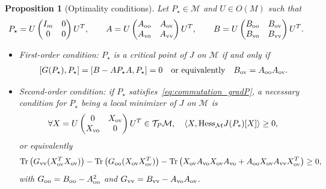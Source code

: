 \documentclass{article}
\newtheorem{proposition}[theorem]{Proposition}
\newcommand{\tr}{{\rm Tr}}
\newcommand{\1}{{\mathds 1}}
\begin{document}
\begin{proposition}[Optimality conditions] \label{Prop:commutation1storder} Let 
$P_\star \in \mathcal M$ and $U \in O(M)$ such that
\begin{align}
    P_\star = U\begin{pmatrix} I_m & 0 \\ 0 & 0\end{pmatrix}U^T, \qquad  
    A = U \begin{pmatrix} A_{\rm oo} & A_{\rm ov} \\ A_{\rm vo} & A_{\rm vv}\end{pmatrix}U^T, \qquad B = U\begin{pmatrix} B_{\rm oo} & B_{\rm ov} \\ B_{\rm vo} & B_{\rm vv}\end{pmatrix}U^T. \label{eq:Pstar_A_B}
\end{align}
\begin{itemize}
\item First-order condition: $P_\star$ is a critical point of $J$ on $\mathcal M$ if and only if 
\begin{align}
\label{eq:commutation_gradP}
    [G(P_\star),P_\star] = [B-AP_\star A,P_\star] =0 \quad \mbox{or equivalently} \quad B_{\rm ov}=A_{\rm oo}A_{\rm ov}.
\end{align}
\item Second-order condition: if $P_\star$ satisfies~\eqref{eq:commutation_gradP}, a necessary condition for $P_\star$ being a local minimizer of $J$ on $\mathcal M$ is 
\begin{align} \label{eq:2nd_order_cond}
  \forall X =   U\begin{pmatrix} 0 & X_{\rm ov} \\ X_{\rm vo} & 0\end{pmatrix}U^T \in \mathcal{T}_{P}\mathcal{M}, \quad \langle X, \mbox{\rm Hess}_{\mathcal{M}} J(P_*)[X] \rangle \ge 0,
\end{align}
or equivalently 
$$
 \tr\left( G_{\rm vv}(X_{\rm ov}^TX_{\rm ov})\right)- \tr \left(G_{\rm oo}(X_{\rm ov}X_{\rm ov}^T)\right) - \tr \left( X_{\rm ov}  A_{\rm vo }X_{\rm ov} A_{\rm vo}+ A_{\rm oo}X_{\rm ov}A_{\rm vv} X_{\rm ov}^T \right) \ge 0,
$$
with $G_{\rm oo}=B_{\rm oo}-A_{\rm oo}^2$ and $G_{\rm vv}=B_{\rm vv}-A_{\rm vo}A_{\rm ov}$. 
\end{itemize}
\end{proposition}
\end{document}
